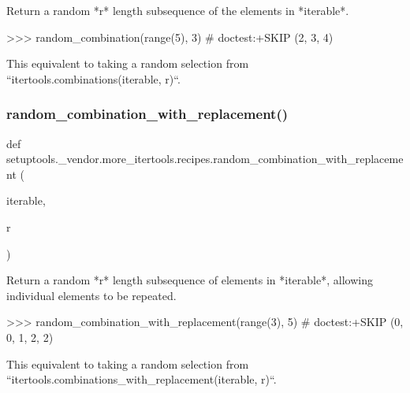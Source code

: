 \begin{DoxyVerb}Return a random *r* length subsequence of the elements in *iterable*.

    >>> random_combination(range(5), 3)  # doctest:+SKIP
    (2, 3, 4)

This equivalent to taking a random selection from
``itertools.combinations(iterable, r)``.\end{DoxyVerb}
 \mbox{\label{namespacesetuptools_1_1__vendor_1_1more__itertools_1_1recipes_aeafdb5ebe9596518b965a9d92f873a00}} 
\subsubsection{\texorpdfstring{random\+\_\+combination\+\_\+with\+\_\+replacement()}{random\_combination\_with\_replacement()}}
{\footnotesize\ttfamily def setuptools.\+\_\+vendor.\+more\+\_\+itertools.\+recipes.\+random\+\_\+combination\+\_\+with\+\_\+replacement (\begin{DoxyParamCaption}\item[{}]{iterable,  }\item[{}]{r }\end{DoxyParamCaption})}

\begin{DoxyVerb}Return a random *r* length subsequence of elements in *iterable*,
allowing individual elements to be repeated.

    >>> random_combination_with_replacement(range(3), 5) # doctest:+SKIP
    (0, 0, 1, 2, 2)

This equivalent to taking a random selection from
``itertools.combinations_with_replacement(iterable, r)``.\end{DoxyVerb}
 \mbox{\label{namespacesetuptools_1_1__vendor_1_1more__itertools_1_1recipes_a4ede505cfa74065398181cbfd6c3a3fa}} 

